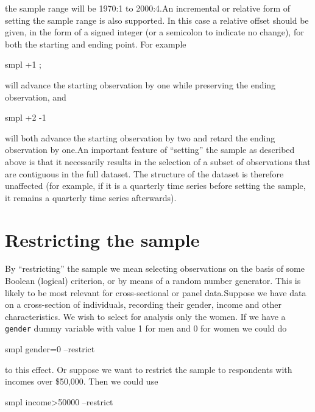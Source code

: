 the sample range will be 1970:1 to 2000:4.An incremental or relative
form of setting the sample range is also supported.  In this case a
relative offset should be given, in the form of a signed integer (or a
semicolon to indicate no change), for both the starting and ending
point. For example

\begin{code}
    smpl +1 ;
\end{code}

will advance the starting observation by one while preserving the
ending observation, and

\begin{code}
    smpl +2 -1
\end{code}

will both advance the starting observation by two and retard the
ending observation by one.An important feature of ``setting'' the
sample as described above is that it necessarily results in the
selection of a subset of observations that are contiguous in the full
dataset. The structure of the dataset is therefore unaffected (for
example, if it is a quarterly time series before setting the sample,
it remains a quarterly time series afterwards).

\section{Restricting the sample}
\label{sample-restrict}

By ``restricting'' the sample we mean selecting observations on the
basis of some Boolean (logical) criterion, or by means of a random
number generator.  This is likely to be most relevant for
cross-sectional or panel data.Suppose we have data on a cross-section
of individuals, recording their gender, income and other
characteristics.  We wish to select for analysis only the women.  If
we have a \verb+gender+ dummy variable with value 1 for men and 0 for
women we could do
%      
\begin{code}
    smpl gender=0 --restrict
\end{code}
%
to this effect.  Or suppose we want to restrict the sample to
respondents with incomes over \$50,000.  Then we could use
%
\begin{code}
    smpl income>50000 --restrict
\end{code}

